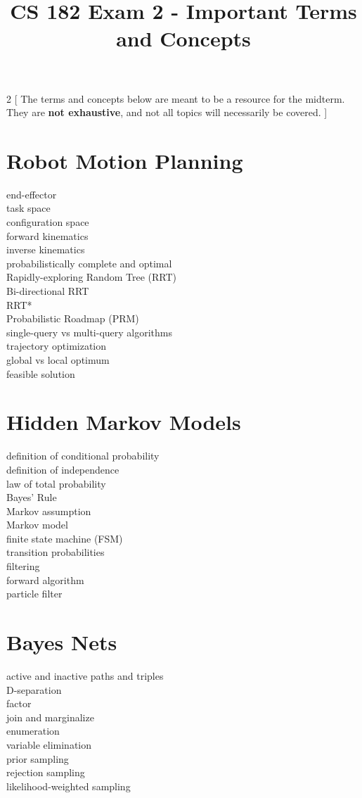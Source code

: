 \documentclass[a4paper]{article}
\title{CS 182 Exam 2 - Important Terms and Concepts\vspace{-4ex}}
\begin{document}
\maketitle

\begin{multicols*}{2}
[
\noindent The terms and concepts below are meant to be a resource for the midterm. They are \textbf{not exhaustive}, and not all topics will necessarily be covered.
]

\section{Robot Motion Planning}
end-effector \\
task space \\
configuration space \\
forward kinematics \\
inverse kinematics \\
probabilistically complete and optimal \\
Rapidly-exploring Random Tree (RRT)\\
Bi-directional RRT\\
RRT*\\
Probabilistic Roadmap (PRM) \\
single-query vs multi-query algorithms \\
trajectory optimization \\
global vs local optimum \\
feasible solution

\section{Hidden Markov Models}
definition of conditional probability \\
definition of independence \\
law of total probability \\
Bayes' Rule \\
Markov assumption \\
Markov model \\
finite state machine (FSM) \\
transition probabilities \\
filtering \\
forward algorithm \\
particle filter

\section{Bayes Nets}
active and inactive paths and triples \\
D-separation \\
factor \\
join and marginalize \\
enumeration \\
variable elimination \\
prior sampling \\
rejection sampling \\
likelihood-weighted sampling \\


\end{multicols*}
\end{document}
